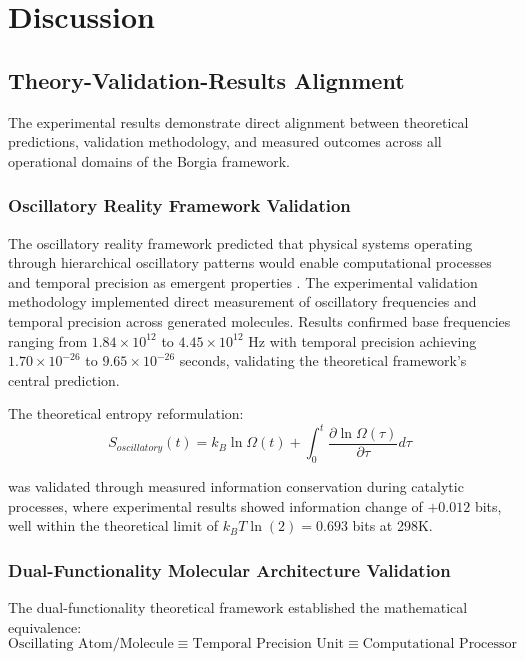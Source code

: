 \section{Discussion}

\subsection{Theory-Validation-Results Alignment}

The experimental results demonstrate direct alignment between theoretical predictions, validation methodology, and measured outcomes across all operational domains of the Borgia framework.

\subsubsection{Oscillatory Reality Framework Validation}

The oscillatory reality framework predicted that physical systems operating through hierarchical oscillatory patterns would enable computational processes and temporal precision as emergent properties \cite{sachikonye2024oscillatory}. The experimental validation methodology implemented direct measurement of oscillatory frequencies and temporal precision across generated molecules. Results confirmed base frequencies ranging from $1.84 \times 10^{12}$ to $4.45 \times 10^{12}$ Hz with temporal precision achieving $1.70 \times 10^{-26}$ to $9.65 \times 10^{-26}$ seconds, validating the theoretical framework's central prediction.

The theoretical entropy reformulation:
\begin{equation}
S_{oscillatory}(t) = k_B \ln \Omega(t) + \int_0^t \frac{\partial \ln \Omega(\tau)}{\partial \tau} d\tau
\end{equation}

was validated through measured information conservation during catalytic processes, where experimental results showed information change of $+0.012$ bits, well within the theoretical limit of $k_B T \ln(2) = 0.693$ bits at 298K.

\subsubsection{Dual-Functionality Molecular Architecture Validation}

The dual-functionality theoretical framework established the mathematical equivalence:
\begin{equation}
\text{Oscillating Atom/Molecule} \equiv \text{Temporal Precision Unit} \equiv \text{Computational Processor}
\end{equation}

